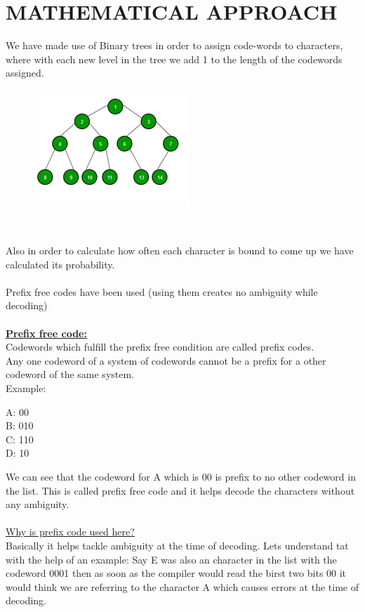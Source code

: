 \documentclass{article}
\begin{document}
\vspace{1cm}

\section{MATHEMATICAL APPROACH}

\Large{We have made use of  Binary trees in order to assign code-words to characters, where with each new level in the tree we add 1 to the length of the codewords assigned.}

\begin{figure}[ht]
\centerline{ \includegraphics[width=.8\linewidth]{P3.png} }
\label{fig}
\end{figure}
\\

\Large{
Also in order to calculate how often each character is bound to come up we have calculated its probability.\\ \\
Prefix free codes have been used  (using them creates no ambiguity while decoding) \\ \\
\underline{\textbf{Prefix free code:}} \\ 
Codewords which fulfill the prefix free condition are called prefix codes. \\
Any one codeword of a system of codewords cannot be a prefix for a other codeword of the same system. \\
Example: 
\begin{center}
A: 00 \\
B: 010 \\
C: 110 \\
D: 10 \\
\end{center}

We can see that the codeword for A which is 00 is prefix to no other codeword in the list. This is called prefix free code and it helps decode the characters without any ambiguity. \\ \\
\underline{Why is prefix code used here?} \\ 
Basically it helps tackle ambiguity at the time of decoding. Lets understand tat with the help of an example: Say E was also an character in the list with the codeword 0001 then as soon as the compiler would read the birst two bits 00 it would think we are referring to the character A which causes errors at the time of decoding.
}
\end{document}
